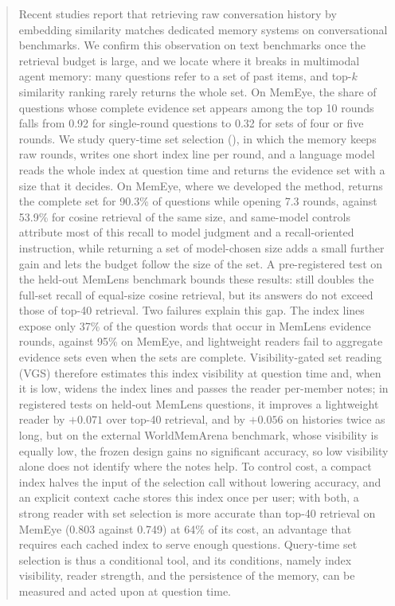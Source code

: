 \begin{abstract}
Recent studies report that retrieving raw conversation history by embedding similarity matches dedicated memory systems on conversational benchmarks. We confirm this observation on text benchmarks once the retrieval budget is large, and we locate where it breaks in multimodal agent memory: many questions refer to a set of past items, and top-$k$ similarity ranking rarely returns the whole set. On MemEye, the share of questions whose complete evidence set appears among the top 10 rounds falls from 0.92 for single-round questions to 0.32 for sets of four or five rounds. We study query-time set selection (\qss{}), in which the memory keeps raw rounds, writes one short index line per round, and a language model reads the whole index at question time and returns the evidence set with a size that it decides. On MemEye, where we developed the method, \qss{} returns the complete set for 90.3\% of questions while opening 7.3 rounds, against 53.9\% for cosine retrieval of the same size, and same-model controls attribute most of this recall to model judgment and a recall-oriented instruction, while returning a set of model-chosen size adds a small further gain and lets the budget follow the size of the set. A pre-registered test on the held-out MemLens benchmark bounds these results: \qss{} still doubles the full-set recall of equal-size cosine retrieval, but its answers do not exceed those of top-40 retrieval. Two failures explain this gap. The index lines expose only 37\% of the question words that occur in MemLens evidence rounds, against 95\% on MemEye, and lightweight readers fail to aggregate evidence sets even when the sets are complete. Visibility-gated set reading (VGS) therefore estimates this index visibility at question time and, when it is low, widens the index lines and passes the reader per-member notes; in registered tests on held-out MemLens questions, it improves a lightweight reader by $+0.071$ over top-40 retrieval, and by $+0.056$ on histories twice as long, but on the external WorldMemArena benchmark, whose visibility is equally low, the frozen design gains no significant accuracy, so low visibility alone does not identify where the notes help. To control cost, a compact index halves the input of the selection call without lowering accuracy, and an explicit context cache stores this index once per user; with both, a strong reader with set selection is more accurate than top-40 retrieval on MemEye (0.803 against 0.749) at 64\% of its cost, an advantage that requires each cached index to serve enough questions. Query-time set selection is thus a conditional tool, and its conditions, namely index visibility, reader strength, and the persistence of the memory, can be measured and acted upon at question time.
\end{abstract}
